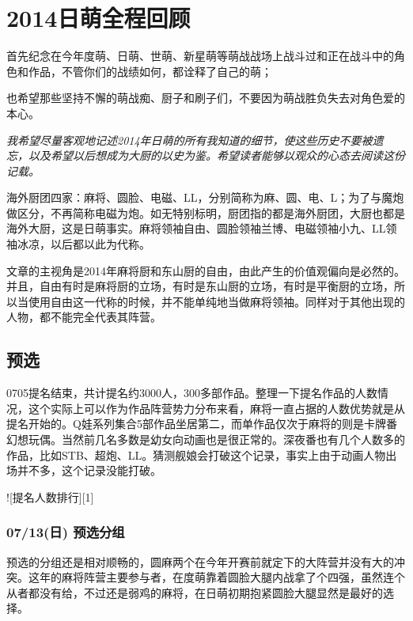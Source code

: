 
\chapter{2014日萌全程回顾}

首先纪念在今年度萌、日萌、世萌、新星萌等萌战战场上战斗过和正在战斗中的角色和作品，不管你们的战绩如何，都诠释了自己的萌；

也希望那些坚持不懈的萌战痴、厨子和刷子们，不要因为萌战胜负失去对角色爱的本心。

\emph{我希望尽量客观地记述2014年日萌的所有我知道的细节，使这些历史不要被遗忘，以及希望以后想成为大厨的以史为鉴。希望读者能够以观众的心态去阅读这份记载。}

海外厨团四家：麻将、圆脸、电磁、LL，分别简称为麻、圆、电、L；为了与魔炮做区分，不再简称电磁为炮。如无特别标明，厨团指的都是海外厨团，大厨也都是海外大厨，这是日萌事实。麻将领袖自由、圆脸领袖兰博、电磁领袖小九、LL领袖冰凉，以后都以此为代称。

文章的主视角是2014年麻将厨和东山厨的自由，由此产生的价值观偏向是必然的。并且，自由有时是麻将厨的立场，有时是东山厨的立场，有时是平衡厨的立场，所以当使用自由这一代称的时候，并不能单纯地当做麻将领袖。同样对于其他出现的人物，都不能完全代表其阵营。

\section{预选}

0705提名结束，共计提名约3000人，300多部作品。整理一下提名作品的人数情况，这个实际上可以作为作品阵营势力分布来看，麻将一直占据的人数优势就是从提名开始的。Q娃系列集合5部作品坐居第二，而单作品仅次于麻将的则是卡牌番幻想玩偶。当然前几名多数是幼女向动画也是很正常的。深夜番也有几个人数多的作品，比如STB、超炮、LL。猜测舰娘会打破这个记录，事实上由于动画人物出场并不多，这个记录没能打破。

![提名人数排行][1]

\subsection{07/13(日) 预选分组}

预选的分组还是相对顺畅的，圆麻两个在今年开赛前就定下的大阵营并没有大的冲突。这年的麻将阵营主要参与者，在度萌靠着圆脸大腿内战拿了个四强，虽然连个从者都没有给，不过还是弱鸡的麻将，在日萌初期抱紧圆脸大腿显然是最好的选择。

